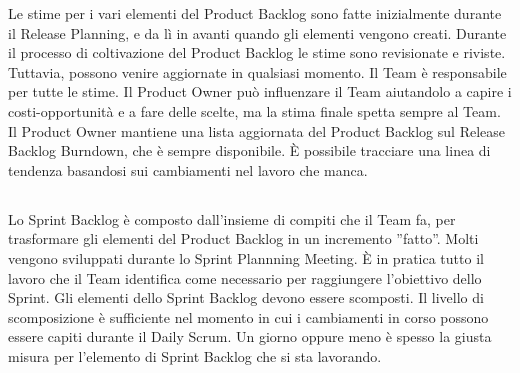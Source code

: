 Le stime per i vari elementi del Product Backlog sono fatte inizialmente durante il Release Planning, e da l\`i in avanti quando gli elementi vengono creati. Durante il processo di coltivazione del Product Backlog le stime sono revisionate e riviste. Tuttavia, possono venire aggiornate in qualsiasi momento. Il Team \`e responsabile per tutte le stime. Il Product Owner pu\`o influenzare il Team aiutandolo a capire i costi-opportunit\`a e a fare delle scelte, ma la stima finale spetta sempre al Team. Il Product Owner mantiene una lista aggiornata del Product Backlog sul Release Backlog Burndown, che \`e sempre disponibile. \`E possibile tracciare una linea di tendenza basandosi sui cambiamenti nel lavoro che manca.  
\newline


  
\subsection*{\color{Blue}{SPRINT BACKLOG E SPRINT BURNDOWN}}
\label{sec:sprintbacklog}

Lo Sprint Backlog \`e composto dall'insieme di compiti che il Team fa, per trasformare gli elementi del Product Backlog in un incremento ''fatto''. Molti vengono sviluppati durante lo Sprint Plannning Meeting. \`E in pratica tutto il lavoro che il Team identifica come necessario per raggiungere l'obiettivo dello Sprint. Gli elementi dello Sprint Backlog devono essere scomposti. Il livello di scomposizione \`e sufficiente nel momento in cui i cambiamenti in corso possono essere capiti durante il Daily Scrum. Un giorno oppure meno \`e spesso la giusta misura per l'elemento di Sprint Backlog che si sta lavorando.
\newline

